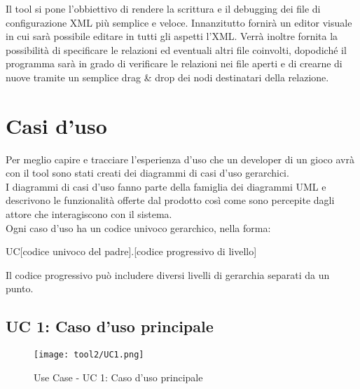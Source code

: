 		Il tool si pone l'obbiettivo di rendere la scrittura e il debugging dei file di configurazione XML più semplice e veloce. Innanzitutto fornirà un editor visuale in cui sarà possibile editare in tutti gli aspetti l'XML. Verrà inoltre fornita la possibilità di specificare le relazioni ed eventuali altri file coinvolti, dopodiché il programma sarà in grado di verificare le relazioni nei file aperti e di crearne di nuove tramite un semplice drag \& drop dei nodi destinatari della relazione.

\section{Casi d'uso}

	Per meglio capire e tracciare l'esperienza d'uso che un developer di un gioco avrà con il tool sono stati creati dei diagrammi di casi d'uso gerarchici.\\
	I diagrammi di casi d'uso fanno parte della famiglia dei diagrammi UML e descrivono le funzionalità offerte dal prodotto così come sono percepite dagli attore che interagiscono con il sistema.\\
	Ogni caso d'uso ha un codice univoco gerarchico, nella forma:
	\begin{center} 
		UC[codice univoco del padre].[codice progressivo di livello]
	\end{center}
	\paragrafo Il codice progressivo può includere diversi livelli di gerarchia separati da un punto.

	\subsection{UC 1: Caso d'uso principale}
		\label{subsec:XEUC1}
		
		\begin{figure}[!h] 
			\centering 
			\texttt{[image: tool2/UC1.png]} 
			\caption{Use Case - UC 1: Caso d'uso principale}
		\end{figure}
		
